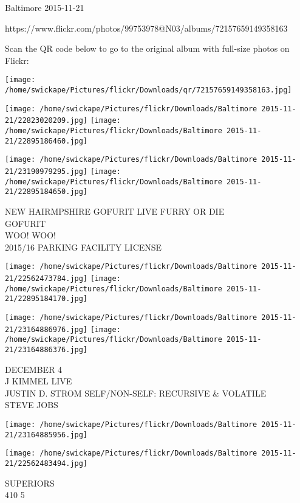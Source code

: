 \documentclass[10pt,letterpaper]{article}
\begin{document}
Baltimore 2015-11-21

https://www.flickr.com/photos/99753978@N03/albums/72157659149358163

Scan the QR code below to go to the original album with full-size photos on Flickr:

\texttt{[image: /home/swickape/Pictures/flickr/Downloads/qr/72157659149358163.jpg]}
\pagebreak

\texttt{[image: /home/swickape/Pictures/flickr/Downloads/Baltimore 2015-11-21/22823020209.jpg]}
\texttt{[image: /home/swickape/Pictures/flickr/Downloads/Baltimore 2015-11-21/22895186460.jpg]}

\texttt{[image: /home/swickape/Pictures/flickr/Downloads/Baltimore 2015-11-21/23190979295.jpg]}
\texttt{[image: /home/swickape/Pictures/flickr/Downloads/Baltimore 2015-11-21/22895184650.jpg]}

NEW HAIRMPSHIRE GOFURIT LIVE FURRY OR DIE\\
GOFURIT\\
WOO!  WOO!\\
2015/16 PARKING FACILITY LICENSE\\
\pagebreak

\texttt{[image: /home/swickape/Pictures/flickr/Downloads/Baltimore 2015-11-21/22562473784.jpg]}
\texttt{[image: /home/swickape/Pictures/flickr/Downloads/Baltimore 2015-11-21/22895184170.jpg]}

\texttt{[image: /home/swickape/Pictures/flickr/Downloads/Baltimore 2015-11-21/23164886976.jpg]}
\texttt{[image: /home/swickape/Pictures/flickr/Downloads/Baltimore 2015-11-21/23164886376.jpg]}

DECEMBER 4\\
J KIMMEL LIVE\\
JUSTIN D. STROM SELF/NON{-}SELF: RECURSIVE \& VOLATILE\\
STEVE JOBS\\
\pagebreak

\texttt{[image: /home/swickape/Pictures/flickr/Downloads/Baltimore 2015-11-21/23164885956.jpg]}

\vspace{0.25in}
\texttt{[image: /home/swickape/Pictures/flickr/Downloads/Baltimore 2015-11-21/22562483494.jpg]}

SUPERIORS\\
410 5\\
\pagebreak
\end{document}
